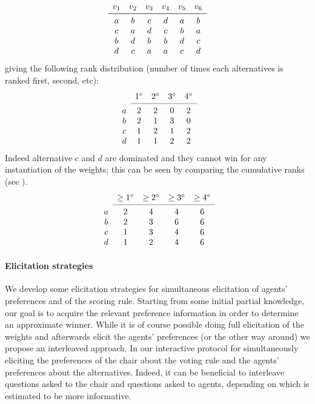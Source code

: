 \begin{example}
\[
\begin{array}{cccccc}
v_1& v_2& v_3 & v_4& v_5& v_6 \\
\midrule 
a& b& c & d& a& b \\
c& a& d& c& b& a \\
b& d& b& b& d& c \\
d& c& a& a& c& d \\
\end{array}
\]
giving the following rank distribution (number of times each alternatives is ranked first, second, etc): 
\[
\begin{array}{ccccc}
& 1^\circ& 2^\circ& 3^\circ& 4^\circ \\
\cmidrule{2-5}
a & 2& 2& 0& 2 \\
b& 2& 1& 3& 0 \\
c& 1& 2& 1& 2 \\
d& 1& 1& 2& 2 \\
\end{array}
\]
Indeed alternative $c$ and $d$ are dominated and they cannot win for any instantiation of the weights; this can be seen by comparing the cumulative ranks (see  \citep{Stein1994}).
\[
\begin{array}{ccccc}
& \geq 1^\circ
& \geq 2^\circ
& \geq 3^\circ
& \geq 4^\circ \\
\cmidrule{2-5}
a & 2 & 4& 4& 6 \\
b & 2 & 3& 6& 6 \\
c& 1& 3& 4& 6 \\
d& 1& 2& 4& 6 \\
\end{array}
\]
\end{example}



\paragraph{Elicitation strategies}

We develop some elicitation strategies for simultaneous elicitation of agents' preferences and of the scoring rule.
Starting from some initial partial knowledge, our goal is to acquire the relevant preference information 
in order to determine an approximate winner.
While it is of course possible doing full elicitation of the weights and afterwards elicit the agents' preferences (or the other way around) we propose an interleaved approach.
In our interactive  protocol for simultaneously eliciting the preferences of the chair about the voting rule and the agents' preferences about the alternatives.
Indeed, it can be beneficial to interleave questions asked to the chair and questions asked to agents, depending on which is estimated to be more informative.

